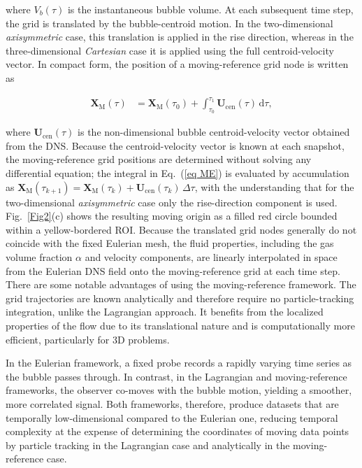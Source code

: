 \documentclass[a4paper,fleqn]{cas-sc}
\begin{document}
	\noindent where $V_b(\tau)$ is the instantaneous bubble volume. At each subsequent time step, the grid is translated by the bubble-centroid motion. In the two-dimensional \textit{axisymmetric} case, this translation is applied in the rise direction, whereas in the three-dimensional \textit{Cartesian} case it is applied using the full centroid-velocity vector. In compact form, the position of a moving-reference grid node is written as
	
	\begin{align}
		\mathbf{X}_{\mathrm{M}}(\tau) &= \mathbf{X}_{\mathrm{M}}(\tau_0) + \int_{\tau_0}^{\tau_1} \mathbf{U}_{\mathrm{cen}}(\tau)\,\mathrm{d}\tau,
		\label{eq ME}
	\end{align}
	
	\noindent where $\mathbf{U}_{\mathrm{cen}}(\tau)$ is the non-dimensional bubble centroid-velocity vector obtained from the DNS. Because the centroid-velocity vector is known at each snapshot, the moving-reference grid positions are determined without solving any differential equation; the integral in Eq.~(\ref{eq ME}) is evaluated by accumulation as $\mathbf{X}_{\mathrm{M}}(\tau_{k+1}) = \mathbf{X}_{\mathrm{M}}(\tau_k) + \mathbf{U}_{\mathrm{cen}}(\tau_k)\,\Delta\tau$, with the understanding that for the two-dimensional \textit{axisymmetric} case only the rise-direction component is used. Fig.~\ref{Fig2}(c) shows the resulting moving origin as a filled red circle bounded within a yellow-bordered ROI. Because the translated grid nodes generally do not coincide with the fixed Eulerian mesh, the fluid properties, including the gas volume fraction $\alpha$ and velocity components, are linearly interpolated in space from the Eulerian DNS field onto the moving-reference grid at each time step. There are some notable advantages of using the moving-reference framework. The grid trajectories are known analytically and therefore require no particle-tracking integration, unlike the Lagrangian approach. It benefits from the localized properties of the flow due to its translational nature and is computationally more efficient, particularly for 3D problems.
	
	In the Eulerian framework, a fixed probe records a rapidly varying time series as the bubble passes through. In contrast, in the Lagrangian and moving-reference frameworks, the observer co-moves with the bubble motion, yielding a smoother, more correlated signal. Both frameworks, therefore, produce datasets that are temporally low-dimensional compared to the Eulerian one, reducing temporal complexity at the expense of determining the coordinates of moving data points by particle tracking in the Lagrangian case and analytically in the moving-reference case.
	
\end{document}
